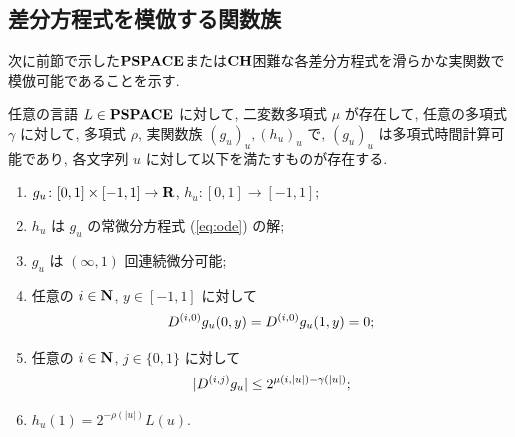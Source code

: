 \subsection{差分方程式を模倣する関数族}
\label{subsection: ode family}
次に前節で示した$\mathbf{PSPACE}$または$\mathbf{CH}$困難な各差分方程式を滑らかな実関数で模倣可能であることを示す.

\begin{lemma}
 \label{DifferentiableFamily}
 任意の言語 $L \in \mathbf{PSPACE}$ に対して, 
 二変数多項式 $\mu$ が存在して,
 任意の多項式 $\gamma$ に対して,
 多項式 $\rho$, 実関数族 $(g_u)_u, (h_u)_u$ で, 
 $(g_u)_u$ は多項式時間計算可能であり,
 各文字列 $u$ に対して以下を満たすものが存在する.
 \begin{enumerate}
  \item $g_u\colon [0,1] \times [-1,1]\to \mathbf R$, $h_u\colon [0,1] \to [-1,1]$;
  \item $h_u$ は $g_u$ の常微分方程式 (\ref{eq:ode}) の解; 
  \item $g_u$ は $(\infty, 1)$ 回連続微分可能;
  \item 任意の $i \in \mathbf N$, $y \in [-1,1]$ に対して
	\begin{equation*}
	 D ^{(i, 0)} g_u(0,y) = D ^{(i, 0)} g_u(1,y) = 0;
	\end{equation*}
  \item \label{enum:infty1}
	任意の $i \in \mathbf N$, $j \in \{0,1\}$ に対して
	\begin{equation*}
	 |D ^{(i,j)} g_u| \leq 2^{\mu(i, |u|) - \gamma(|u|)};
	\end{equation*}
  \item $h_u(1) = 2^{-\rho(|u|)}L(u)$.
 \end{enumerate}
\end{lemma}


